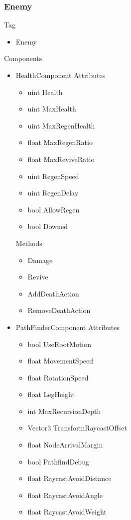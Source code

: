 \documentclass[11pt]{article}
\begin{document}
\subsubsection{Enemy}
Tag
\begin{itemize}
	\item Enemy
\end{itemize}
Components
\begin{itemize}
	\item HealthComponent
	\newline Attributes
	\begin{itemize}
		\item uint Health
		\item uint MaxHealth
		\item uint MaxRegenHealth
		\item float MaxRegenRatio
		\item float MaxReviveRatio
		\item uint RegenSpeed
		\item uint RegenDelay
		\item bool AllowRegen
		\item bool Downed
	\end{itemize}
	Methods
	\begin{itemize}
		\item Damage
		\item Revive
		\item AddDeathAction
		\item RemoveDeathAction
	\end{itemize}
\newpage
	\item PathFinderComponent
	\newline Attributes
	\begin{itemize}
		\item bool UseRootMotion
		\item float MovementSpeed
		\item float RotationSpeed
		\item float LegHeight
		\newline
		\item int MaxRecursionDepth
		\item Vector3 TransformRaycastOffset
		\item float NodeArrivalMargin
		\item bool PathfindDebug
		\newline
		\item float RaycastAvoidDistance
		\item float RaycastAvoidAngle
		\item float RaycastAvoidWeight

\end{itemize}
\end{itemize}
\end{document}

